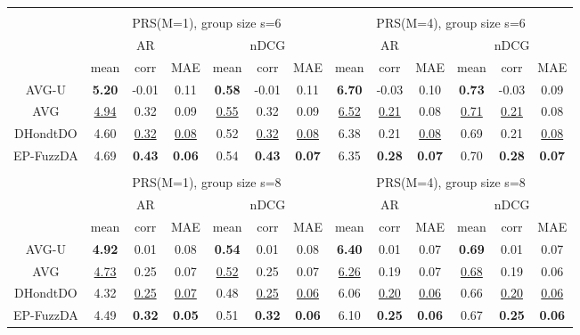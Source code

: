 \begin{tabular}{ c | c c c | c c c || c c c | c c c}
\multicolumn{12}{c}{} \\
\multicolumn{1}{c}{} & \multicolumn{6}{c}{PRS(M=1), group size s=6} & \multicolumn{6}{c}{PRS(M=4), group size s=6} \\
\multicolumn{1}{c}{} & \multicolumn{3}{c}{AR} & \multicolumn{3}{c}{nDCG} & \multicolumn{3}{c}{AR} & \multicolumn{3}{c}{nDCG} \\
& mean & corr & MAE & mean & corr & MAE & mean & corr & MAE & mean & corr & MAE \\
\hline
AVG-U & \textbf{5.20} & -0.01 & 0.11 & \textbf{0.58} & -0.01 & 0.11 & \textbf{6.70} & -0.03 & 0.10 & \textbf{0.73} & -0.03 & 0.09 \\
AVG & \underline{4.94} & 0.32 & 0.09 & \underline{0.55} & 0.32 & 0.09 & \underline{6.52} & \underline{0.21} & 0.08 & \underline{0.71} & \underline{0.21} & 0.08 \\
DHondtDO & 4.60 & \underline{0.32} & \underline{0.08} & 0.52 & \underline{0.32} & \underline{0.08} & 6.38 & 0.21 & \underline{0.08} & 0.69 & 0.21 & \underline{0.08} \\
EP-FuzzDA & 4.69 & \textbf{0.43} & \textbf{0.06} & 0.54 & \textbf{0.43} & \textbf{0.07} & 6.35 & \textbf{0.28} & \textbf{0.07} & 0.70 & \textbf{0.28} & \textbf{0.07} \\

\multicolumn{12}{c}{} \\
\multicolumn{1}{c}{} & \multicolumn{6}{c}{PRS(M=1), group size s=8} & \multicolumn{6}{c}{PRS(M=4), group size s=8} \\
\multicolumn{1}{c}{} & \multicolumn{3}{c}{AR} & \multicolumn{3}{c}{nDCG} & \multicolumn{3}{c}{AR} & \multicolumn{3}{c}{nDCG} \\
& mean & corr & MAE & mean & corr & MAE & mean & corr & MAE & mean & corr & MAE \\
\hline
AVG-U & \textbf{4.92} & 0.01 & 0.08 & \textbf{0.54} & 0.01 & 0.08 & \textbf{6.40} & 0.01 & 0.07 & \textbf{0.69} & 0.01 & 0.07 \\
AVG & \underline{4.73} & 0.25 & 0.07 & \underline{0.52} & 0.25 & 0.07 & \underline{6.26} & 0.19 & 0.07 & \underline{0.68} & 0.19 & 0.06 \\
DHondtDO & 4.32 & \underline{0.25} & \underline{0.07} & 0.48 & \underline{0.25} & \underline{0.06} & 6.06 & \underline{0.20} & \underline{0.06} & 0.66 & \underline{0.20} & \underline{0.06} \\
EP-FuzzDA & 4.49 & \textbf{0.32} & \textbf{0.05} & 0.51 & \textbf{0.32} & \textbf{0.06} & 6.10 & \textbf{0.25} & \textbf{0.06} & 0.67 & \textbf{0.25} & \textbf{0.06} \\

\end{tabular}
